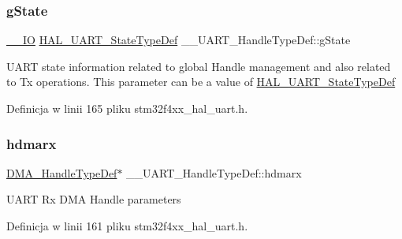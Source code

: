 \mbox{\label{struct_____u_a_r_t___handle_type_def_a0c4242c009d8754417dfd87a5ab6cb10}} 
\subsubsection{\texorpdfstring{g\+State}{gState}}
{\footnotesize\ttfamily \hyperlink{core__sc300_8h_aec43007d9998a0a0e01faede4133d6be}{\+\_\+\+\_\+\+IO} \hyperlink{group___u_a_r_t___exported___types_gaf55d844a35379c204c90be5d1e8e50ba}{H\+A\+L\+\_\+\+U\+A\+R\+T\+\_\+\+State\+Type\+Def} \+\_\+\+\_\+\+U\+A\+R\+T\+\_\+\+Handle\+Type\+Def\+::g\+State}

U\+A\+RT state information related to global Handle management and also related to Tx operations. This parameter can be a value of \hyperlink{group___u_a_r_t___exported___types_gaf55d844a35379c204c90be5d1e8e50ba}{H\+A\+L\+\_\+\+U\+A\+R\+T\+\_\+\+State\+Type\+Def} 

Definicja w linii 165 pliku stm32f4xx\+\_\+hal\+\_\+uart.\+h.

\mbox{\label{struct_____u_a_r_t___handle_type_def_aad7929af8d6acf108c85fe9c7b83c128}} 
\subsubsection{\texorpdfstring{hdmarx}{hdmarx}}
{\footnotesize\ttfamily \hyperlink{group___d_m_a___exported___types_ga41b754a906b86bce54dc79938970138b}{D\+M\+A\+\_\+\+Handle\+Type\+Def}$\ast$ \+\_\+\+\_\+\+U\+A\+R\+T\+\_\+\+Handle\+Type\+Def\+::hdmarx}

U\+A\+RT Rx D\+MA Handle parameters 

Definicja w linii 161 pliku stm32f4xx\+\_\+hal\+\_\+uart.\+h.

\mbox{\label{struct_____u_a_r_t___handle_type_def_afdedbb0ffa1d4bc145a01434d4794c92}} 
